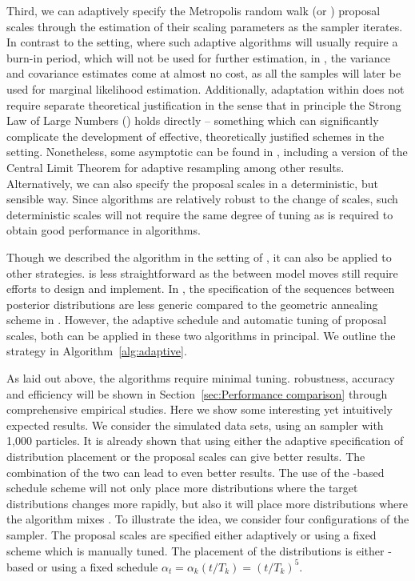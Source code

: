 Third, we can adaptively specify the Metropolis random walk (or \mala) proposal scales through the estimation of their scaling parameters as the sampler iterates. In contrast to the \mcmc setting, where such adaptive algorithms will usually require a burn-in period, which will not be used for further estimation, in \smc, the variance and covariance estimates come at almost no cost, as all the samples will later be used for marginal likelihood estimation. Additionally, adaptation within \smc does not require separate theoretical justification in the sense that in principle the Strong Law of Large Numbers (\slln) holds directly -- something which can significantly complicate the development of effective, theoretically justified schemes in the \mcmc setting. Nonetheless, some asymptotic  can be found in \cite{Beskos:2013vx}, including a version of the Central Limit Theorem for adaptive resampling among other results. Alternatively, we can also specify the proposal scales in a deterministic, but sensible way. Since \smc algorithms are relatively robust to the change of scales, such deterministic scales will not require the same degree of tuning as is required to obtain good performance in \mcmc algorithms.

Though we described the algorithm in the setting of \smc[2], it can also be applied to other \smc strategies. \smc[1] is less straightforward as the between model moves still require efforts to design and implement. In \smc[3], the specification of the sequences between posterior distributions are less generic compared to the geometric annealing scheme in \smc[2]. However, the adaptive schedule and automatic tuning of \mcmc proposal scales, both can be applied in these two algorithms in principal. We outline the strategy in Algorithm~\ref{alg:adaptive}.



As laid out above, the algorithms require minimal tuning.  robustness, accuracy and efficiency will be shown in Section~\ref{sec:Performance comparison} through comprehensive empirical studies. Here we show some interesting yet intuitively expected results. We consider the simulated \pet data sets, using an \smc[2] sampler with 1,000 particles. It is already shown that using either the adaptive specification of distribution placement or the \mcmc proposal scales can give better results. The combination of the two can lead to even better results. The use of the \cess-based schedule scheme will not only place more distributions where the target distributions changes more rapidly, but also it will place more distributions where the \mcmc algorithm mixes . To illustrate the idea, we consider four configurations of the sampler. The proposal scales are specified either adaptively or using a fixed scheme which is manually tuned. The placement of the distributions is either \cess-based or using a fixed schedule $\alpha_t = \alpha_k(t/T_k) = (t/T_k)^5$.

